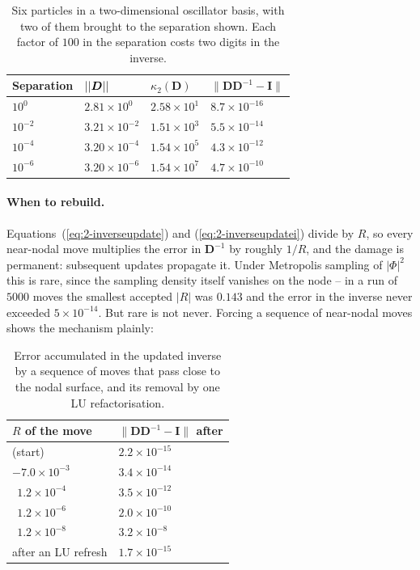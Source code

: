 \begin{table}[h]
\centering
\renewcommand{\arraystretch}{1.25}
\setlength{\tabcolsep}{10pt}
\begin{tabular}{llll}
\toprule
\textbf{Separation} & $\left|{|\boldsymbol{D}|}\right|$ & $\kappa_2(\bm{D})$ &
$\|\bm{D}\bm{D}^{-1}-\bm{I}\|$\\
\midrule
$10^{0}$  & $2.81\times10^{0}$  & $2.58\times10^{1}$ & $8.7\times10^{-16}$\\
$10^{-2}$ & $3.21\times10^{-2}$ & $1.51\times10^{3}$ & $5.5\times10^{-14}$\\
$10^{-4}$ & $3.20\times10^{-4}$ & $1.54\times10^{5}$ & $4.3\times10^{-12}$\\
$10^{-6}$ & $3.20\times10^{-6}$ & $1.54\times10^{7}$ & $4.7\times10^{-10}$\\
\bottomrule
\end{tabular}
\caption{Six particles in a two-dimensional oscillator basis, with two of them
brought to the separation shown.  Each factor of $100$ in the separation costs
two digits in the inverse.}
\label{tab:nodal}
\end{table}

\paragraph{When to rebuild.}
Equations~(\ref{eq:2-inverseupdate}) and (\ref{eq:2-inverseupdatei}) divide by
$R$, so every near-nodal move multiplies the error in $\bm{D}^{-1}$ by roughly
$1/R$, and the damage is permanent: subsequent updates propagate it.  Under
Metropolis sampling of $|\Phi|^2$ this is rare, since the sampling density
itself vanishes on the node -- in a run of $5000$ moves the smallest accepted
$|R|$ was $0.143$ and the error in the inverse never exceeded
$5\times10^{-14}$.  But rare is not never.  Forcing a sequence of near-nodal
moves shows the mechanism plainly:

\begin{table}[h]
\centering
\renewcommand{\arraystretch}{1.25}
\setlength{\tabcolsep}{14pt}
\begin{tabular}{ll}
\toprule
$R$ \textbf{of the move} & $\|\bm{D}\bm{D}^{-1}-\bm{I}\|$ \textbf{after}\\
\midrule
(start)              & $2.2\times10^{-15}$\\
$-7.0\times10^{-3}$  & $3.4\times10^{-14}$\\
$\ \ 1.2\times10^{-4}$ & $3.5\times10^{-12}$\\
$\ \ 1.2\times10^{-6}$ & $2.0\times10^{-10}$\\
$\ \ 1.2\times10^{-8}$ & $3.2\times10^{-8}$\\
\midrule
after an LU refresh  & $1.7\times10^{-15}$\\
\bottomrule
\end{tabular}
\caption{Error accumulated in the updated inverse by a sequence of moves that
pass close to the nodal surface, and its removal by one LU refactorisation.}
\label{tab:refresh}
\end{table}


